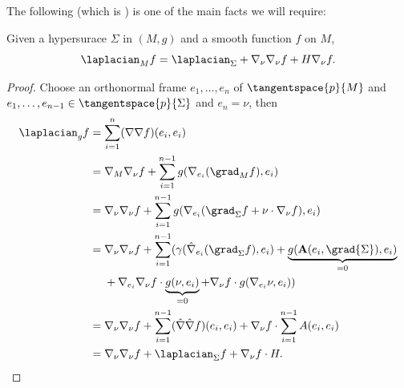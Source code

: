 \documentclass[titlepage,numbers=noenddot,headinclude,oneside,%
footinclude=true,cleardoublepage=empty,%
BCOR=5mm,paper=a4,fontsize=11pt,%
english,%
]{scrartcl}
\begin{document}
{The following (which is \cite[Exercise 2.3 in][]{leeGeometricRelativity2019}) is one of the main facts we will require:
\begin{fact}
    Given a hypersurace \( \Sigma \) in \( (M,g) \) and a smooth function \( f \) on \( M \),
    \begin{equation*}
        \laplacian_M f=\laplacian_\Sigma +\Mconnection_\nu\Mconnection_\nu f+H \Mconnection_\nu f.
    \end{equation*}
\end{fact}
\begin{proof}
    Choose an orthonormal frame \( e_1,\dotsc,e_n \) of \( \tangentspace{p}{M} \) and \( e_1,\dotsc,e_{n-1}\in \tangentspace{p}{\Sigma} \) and \( e_n=\nu \), then
    \begin{align*}
        \laplacian_g f&=\sum_{i=1}^{n}(\Mconnection\Mconnection f)(e_i,e_i)\\
        &=\Mconnection_M \Mconnection_\nu f+\sum_{i=1}^{n-1}g(\Mconnection_{e_i} (\grad_M f),e_i)\\
        &=\Mconnection_\nu \Mconnection_\nu f+\sum_{i=1}^{n-1}g(\Mconnection_{e_i}(\grad_{\Sigma}f+\nu\cdot \Mconnection_\nu f),e_i)\\
        &=\begin{aligned}[t]
            &\Mconnection_\nu \Mconnection_\nu f+\sum_{i=1}^{n-1}(\gamma(\Sigmaconnection_{e_i}(\grad_{\Sigma} f),e_i)+\underbrace{g(\mathbf{A}(e_i,\grad{\Sigma}),e_i)}_{=0}\\
            &+\Mconnection_{
        e_i}\Mconnection_{\nu}f\cdot \underbrace{g(\nu,e_i)}_{=0}+\Mconnection_{\nu}f\cdot g(\Mconnection_{e_i}\nu,e_i))
        \end{aligned}\\
        &=\Mconnection_\nu \Mconnection_\nu f+\sum_{i=1}^{n-1}(\Sigmaconnection\Sigmaconnection f)(e_i,e_i)+\Mconnection_\nu f\cdot \sum_{i=1}^{n-1}A(e_i,e_i)\\
        &=\Mconnection_\nu \Mconnection_\nu f+\laplacian_{\Sigma}f+\Mconnection_{\nu}f\cdot H.
    \end{align*}
\end{proof}
}

\end{document}

